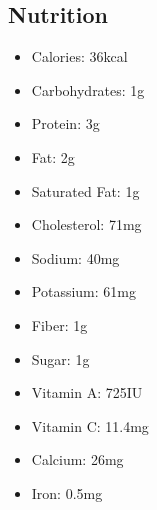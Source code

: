 \subsection{Nutrition}
\begin{itemize}
    \item Calories: 36kcal
    \item Carbohydrates: 1g
    \item Protein: 3g
    \item Fat: 2g
    \item Saturated Fat: 1g
    \item Cholesterol: 71mg
    \item Sodium: 40mg
    \item Potassium: 61mg
    \item Fiber: 1g
    \item Sugar: 1g
    \item Vitamin A: 725IU
    \item Vitamin C: 11.4mg
    \item Calcium: 26mg
    \item Iron: 0.5mg
\end{itemize}
